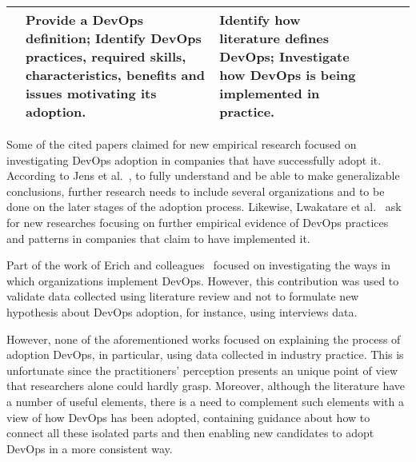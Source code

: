 \begin{table*}[t]
\begin{tabular}{|p{1.4cm}|p{2.72cm}|p{2.72cm}|p{2.72cm}|p{2.72cm}|p{2.72cm}|}
&
Provide a DevOps definition;
\newline \newline
Identify DevOps practices, required skills, characteristics, benefits and
issues motivating its adoption.

&
Identify how literature defines DevOps;
\newline \newline
Investigate how DevOps is being implemented in practice.\\ \bottomrule

\end{tabular}
\end{table*}

Some of the cited papers claimed for new empirical research focused on
investigating DevOps adoption in companies that have successfully adopt it.
According to Jens et al.~\cite{devops_a_definition_xp_15}, to fully understand and be able to make
generalizable conclusions, further research needs to include several
organizations and to be done on the later stages of the adoption process.
Likewise, Lwakatare et al.~\cite{extending_dimensions_icsea_16} ask for new researches
focusing on further empirical evidence of DevOps practices and patterns in
companies that claim to have implemented it.

Part of the work of Erich and colleagues~\cite{qualitative_devops_journalsw_17}
focused on investigating the
ways in which organizations implement DevOps. However, this contribution was
used to validate data collected using literature review and not to formulate
new hypothesis about DevOps adoption, for instance, using interviews data.

However, none of the aforementioned works focused on explaining the process of adoption DevOps,
in particular, using data collected in industry practice. This is unfortunate since the
practitioners' perception presents an unique point of view that researchers
alone could hardly grasp. Moreover, although the literature have a number of
useful elements, there is a need to complement such elements with a view of how DevOps has
been adopted, containing guidance about how to connect all these isolated parts
and then enabling new candidates to adopt DevOps in a more consistent way.
